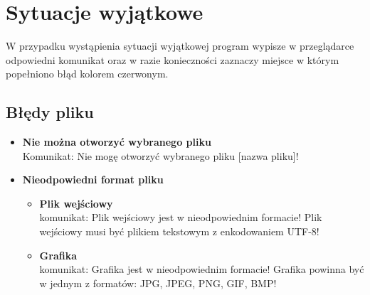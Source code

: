 \documentclass[a4paper, 10pt, titlepage]{article}
\begin{document}
\section{Sytuacje wyjątkowe}
W przypadku wystąpienia sytuacji wyjątkowej program wypisze w przeglądarce odpowiedni komunikat oraz w razie konieczności zaznaczy miejsce w którym popełniono błąd kolorem czerwonym.

\subsection{Błędy pliku}

\begin{itemize}
\item{\textbf{Nie można otworzyć wybranego pliku}}
\\Komunikat: Nie mogę otworzyć wybranego pliku [nazwa pliku]!  
\item \textbf{Nieodpowiedni format pliku}
\begin{itemize}
\item \textbf{Plik wejściowy}
\\ komunikat: Plik wejściowy jest w nieodpowiednim formacie! Plik wejściowy musi być plikiem tekstowym z enkodowaniem UTF-8! 
\item \textbf{Grafika}
\\ komunikat: Grafika jest w nieodpowiednim formacie! Grafika powinna być w jednym z formatów: JPG, JPEG, PNG, GIF, BMP! 
\end{itemize}
\end{itemize}
\end{document}
